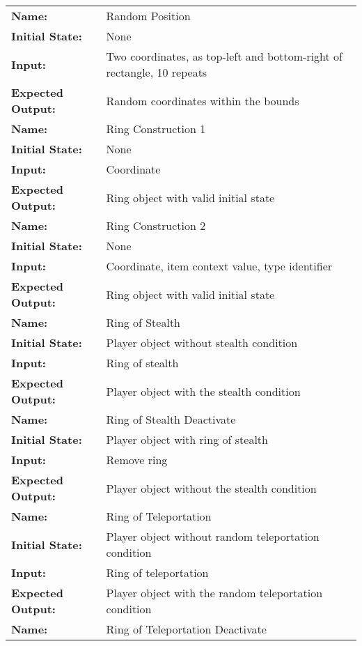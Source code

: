 \documentclass[12pt, titlepage]{article}
\begin{document}
\begin{center}
\begin{longtable}{ l | p{10cm} }
				\hline
				\rule{0pt}{2em}\textbf{Name:} & Random Position\\
				\textbf{Initial State:} & None\\
				\textbf{Input:} & Two coordinates, as top-left and bottom-right of rectangle, 10 repeats\\
				\textbf{Expected Output:} & Random coordinates within the bounds\\[1em]
				\hline
				\rule{0pt}{2em}\textbf{Name:} & Ring Construction 1\\
				\textbf{Initial State:} & None\\
				\textbf{Input:} & Coordinate\\
				\textbf{Expected Output:} & Ring object with valid initial state\\[1em]
				\hline
				\rule{0pt}{2em}\textbf{Name:} & Ring Construction 2\\
				\textbf{Initial State:} & None\\
				\textbf{Input:} & Coordinate, item context value, type identifier\\
				\textbf{Expected Output:} & Ring object with valid initial state\\[1em]
				\hline
				\rule{0pt}{2em}\textbf{Name:} & Ring of Stealth\\
				\textbf{Initial State:} & Player object without stealth condition\\
				\textbf{Input:} & Ring of stealth\\
				\textbf{Expected Output:} & Player object with the stealth condition\\[1em]
				\hline
				\rule{0pt}{2em}\textbf{Name:} & Ring of Stealth Deactivate\\
				\textbf{Initial State:} & Player object with ring of stealth\\
				\textbf{Input:} & Remove ring\\
				\textbf{Expected Output:} & Player object without the stealth condition\\[1em]
				\hline
				\rule{0pt}{2em}\textbf{Name:} & Ring of Teleportation\\
				\textbf{Initial State:} & Player object without random teleportation condition\\
				\textbf{Input:} & Ring of teleportation\\
				\textbf{Expected Output:} & Player object with the random teleportation condition\\[1em]
				\hline
				\rule{0pt}{2em}\textbf{Name:} & Ring of Teleportation Deactivate\\

\end{longtable}
\end{center}
\end{document}
